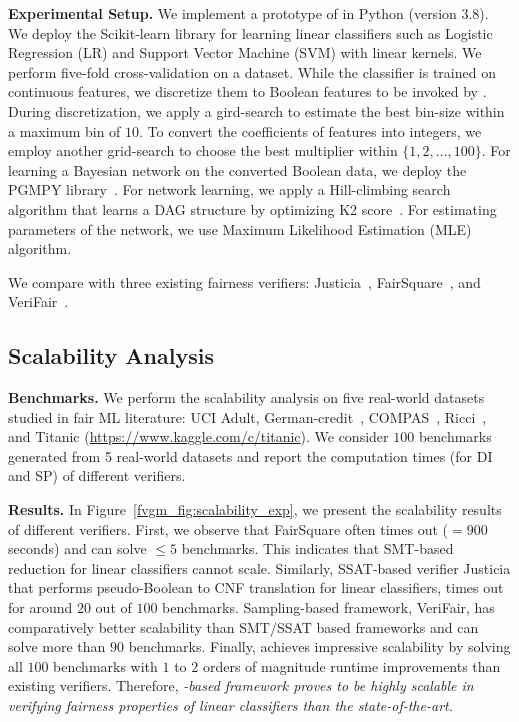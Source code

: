 \textbf{Experimental Setup.}
We  implement a  prototype of {\fvgm} in Python (version 3.8).  
We deploy the Scikit-learn library for learning linear classifiers such as Logistic Regression (LR) and Support Vector Machine (SVM) with linear kernels. We perform five-fold cross-validation on a dataset. While the classifier is trained on continuous features, we discretize them to Boolean features to be invoked by {\fvgm}. During discretization, we apply a gird-search to estimate the best bin-size within a maximum bin of $ 10 $. To convert the coefficients of features into integers, we employ another grid-search to choose the best multiplier within $ \{1,2, \dots, 100\} $. For learning a Bayesian network on the converted Boolean data, we deploy the PGMPY library~\cite{ankan2015pgmpy}. For network learning, we apply a Hill-climbing search algorithm that learns a DAG structure by optimizing K2 score~\cite{koller2009probabilistic}. For estimating parameters of the network, we use Maximum Likelihood Estimation (MLE) algorithm. 

We compare {\fvgm} with three existing fairness verifiers: Justicia~\cite{ghosh2020justicia}, FairSquare~\cite{albarghouthi2017fairsquare}, and VeriFair~\cite{bastani2019probabilistic}. 


\subsection{Scalability Analysis}
\textbf{Benchmarks.} We perform the scalability analysis on five real-world datasets studied in fair ML literature: UCI Adult, German-credit~\cite{DK2017}, COMPAS~\cite{angwin2016machine}, Ricci~\cite{mcginley2010ricci}, and Titanic (\url{https://www.kaggle.com/c/titanic}). We consider $ 100 $ benchmarks generated from 5 real-world datasets and report the computation times (for DI and SP) of different verifiers.

\textbf{Results.} In Figure~\ref{fvgm_fig:scalability_exp}, we present the scalability results of different verifiers. First, we observe that FairSquare often times out ($ =900 $ seconds) and can solve $ \le 5 $ benchmarks. This indicates that SMT-based reduction for linear classifiers cannot scale. Similarly, SSAT-based verifier Justicia that performs pseudo-Boolean to CNF translation for linear classifiers, times out for around $  20 $ out of $ 100 $ benchmarks. Sampling-based framework, VeriFair, has comparatively better scalability than SMT/SSAT based frameworks and can solve more than $ 90 $ benchmarks. Finally, {\fvgm} achieves impressive scalability by solving all $ 100 $ benchmarks with $ 1 $ to $ 2 $ orders of magnitude runtime improvements than existing verifiers. Therefore,\textit{ {\stochastic}-based framework {\fvgm} proves to be highly scalable in verifying fairness properties of linear classifiers than the state-of-the-art.} 

